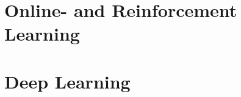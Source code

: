 \documentclass[11pt]{book} %
\begin{document}


%

%
%    
%
%
%

\chapter{Online- and Reinforcement Learning}
\label{chap:online}
\chapter{Deep Learning}

\newpage
\end{document}
